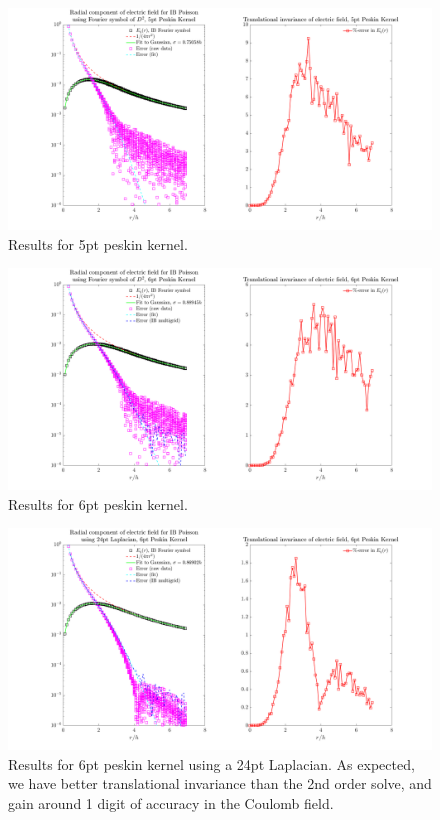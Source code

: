 \begin{figure}[H]
	\centering
	\includegraphics[width=1\columnwidth]{../Figures/5pt_peskin.png}
	\caption{Results for 5pt peskin kernel.}\label{pesk5}
\end{figure}
\begin{figure}[H]
	\centering
	\includegraphics[width=1\columnwidth]{../Figures/6pt_peskin.png}
	\caption{Results for 6pt peskin kernel.}\label{pesk6}
\end{figure}
\begin{figure}[H]
	\centering
	\includegraphics[width=1\columnwidth]{../Figures/6pt_peskin_24ptlap_correct.png}
	\caption{Results for 6pt peskin kernel using a 24pt Laplacian. As expected, we have better translational invariance than the 2nd order solve, and gain around 1 digit of accuracy in the Coulomb field.}\label{pesk624pt}
\end{figure}
